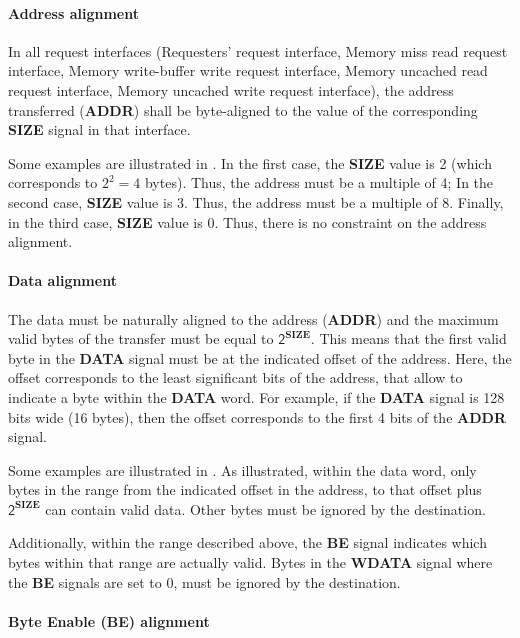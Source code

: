 \documentclass[10pt,titlepage,twoside]{book}
\begin{document}
\paragraph{Address alignment}\mbox{}

In all request interfaces (Requesters' request interface, Memory miss read request interface, Memory write-buffer write request interface, Memory uncached read request interface, Memory uncached write request interface), the address transferred (\textbf{ADDR}) shall be byte-aligned to the value of the corresponding \textbf{SIZE} signal in that interface.

Some examples are illustrated in .
In the first case, the \textbf{SIZE} value is 2 (which corresponds to $2^2=4$ bytes).
Thus, the address must be a multiple of 4;
In the second case, \textbf{SIZE} value is 3.
Thus, the address must be a multiple of 8.
Finally, in the third case, \textbf{SIZE} value is 0.
Thus, there is no constraint on the address alignment.

\paragraph{Data alignment}\mbox{}

The data must be naturally aligned to the address (\textbf{ADDR}) and the maximum valid bytes of the transfer must be equal to $\mathsf{2^\mathbf{SIZE}}$.
This means that the first valid byte in the \textbf{DATA} signal must be at the indicated offset of the address.
Here, the offset corresponds to the least significant bits of the address, that allow to indicate a byte within the \textbf{DATA} word.
For example, if the \textbf{DATA} signal is 128 bits wide (16 bytes), then the offset corresponds to the first 4 bits of the \textbf{ADDR} signal.

Some examples are illustrated in .
As illustrated, within the data word, only bytes in the range from the indicated offset in the address, to that offset plus $\mathsf{2^\mathbf{SIZE}}$ can contain valid data.
Other bytes must be ignored by the destination.

Additionally, within the range described above, the \textbf{BE} signal indicates which bytes within that range are actually valid.
Bytes in the \textbf{WDATA} signal where the \textbf{BE} signals are set to 0, must be ignored by the destination.

\paragraph{Byte Enable (BE) alignment}\mbox{}
\end{document}

